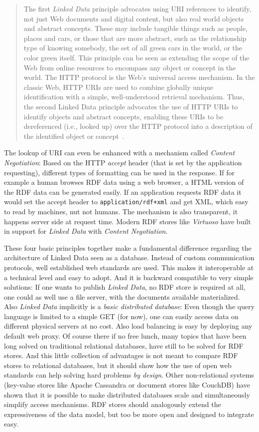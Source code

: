 \begin{quotation}
The first \textit{Linked Data} principle advocates using URI references to identify, not just Web documents and digital content, but also real world objects and abstract concepts. These may include tangible things such as people, places and cars, or those that are more abstract, such as the relationship type of knowing somebody, the set of all green cars in the world, or the color green itself. This principle can be seen as extending the scope of the Web from online resources to encompass any object or concept in the world. The HTTP protocol is the Web’s universal access mechanism. In the classic Web, HTTP URIs are used to combine globally unique identification with a simple, well-understood retrieval mechanism. Thus, the second Linked Data principle advocates the use of HTTP URIs to identify objects and abstract concepts, enabling these URIs to be dereferenced (i.e., looked up) over the HTTP protocol into a description of the identified object or concept~\cite{linkeddata-book}.
\end{quotation}
The lookup of URI can even be enhanced with a mechanism called \textit{Content Negotiation}: Based on the HTTP \textit{accept} header (that is set by the application requesting), different types of formatting can be used in the response. If for example a human browses RDF data using a web browser, a HTML version of the RDF data can be generated easily. If an application requests RDF data it would set the accept header to \texttt{application/rdf+xml} and get XML, which easy to read by machines, nut not humans. The mechanism is also transparent, it happens server side at request time.  Modern RDF stores like \textit{Virtuoso} have built in support for \textit{Linked Data} with \textit{Content Negotiation}.

These four basic principles together make a fundamental difference regarding the architecture of Linked Data seen as a database. Instead of custom communication protocols, well established web standards are used. This makes it interoperable at a technical level and easy to adopt.
And it is backward compatible to very simple solutions: If one wants to publish \textit{Linked Data}, no RDF store is required at all, one could as well use a file server, with the documents available materialized.
Also \textit{Linked Data} implicitly is a \textit{basic distributed database}: Even though the query language is limited to a simple GET (for now), one can easily access data on different physical servers at no cost. Also load balancing is easy by deploying any default web proxy. Of course there if no free lunch, many topics that have been long solved on traditional relational databases, have still to be solved for RDF stores. And this little collection of advantages is not meant to compare RDF stores to relational databases, but it should show how the use of open web standards can help solving hard problems \textit{by design}. Other non-relational systems (key-value stores like Apache Cassandra or document stores like CouchDB) have shown that it is possible to make distributed databases scale and simultaneously simplify access mechanisms. RDF stores should analogously extend the expressiveness of the data model, but too be more open and designed to integrate easy.

